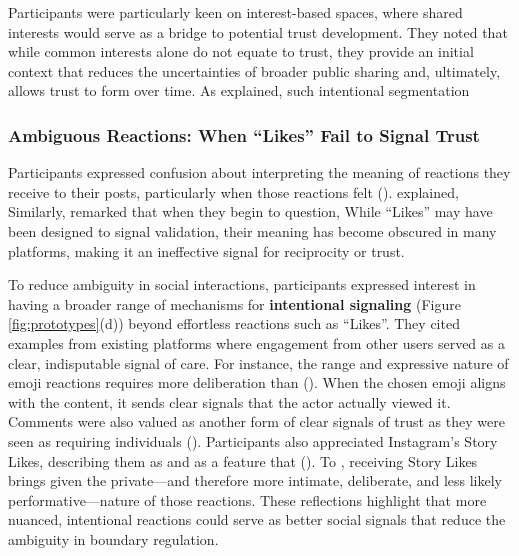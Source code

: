 Participants were particularly keen on interest-based spaces, where shared interests would serve as a bridge to potential trust development. They noted that while common interests alone do not equate to trust, they provide an initial context that reduces the uncertainties of broader public sharing and, ultimately, allows trust to form over time. As  explained, such intentional segmentation 


\subsubsection{Ambiguous Reactions: When ``Likes'' Fail to Signal Trust}
\label{section:4-2-4}
Participants expressed confusion about interpreting the meaning of reactions they receive to their posts, particularly when those reactions felt  ().  explained,  Similarly,  remarked that when  they begin to question,  While ``Likes'' may have been designed to signal validation, their meaning has become obscured in many platforms, making it an ineffective signal for reciprocity or trust.

To reduce ambiguity in social interactions, participants expressed interest in having a broader range of mechanisms for \textbf{intentional signaling} (Figure \ref{fig:prototypes}(d)) beyond effortless reactions such as ``Likes''. They cited examples from existing platforms where engagement from other users served as a clear, indisputable signal of care. For instance, the range and expressive nature of emoji reactions requires more deliberation than (). When the chosen emoji aligns with the content, it sends clear signals that the actor actually viewed it. Comments were also valued as another form of clear signals of trust as they were seen as requiring individuals  (). Participants also appreciated Instagram's Story Likes, describing them as  and as a feature that  (). To , receiving Story Likes brings  given the private---and therefore more intimate, deliberate, and less likely performative---nature of those reactions. These reflections highlight that more nuanced, intentional reactions could serve as better social signals that reduce the ambiguity in boundary regulation.

